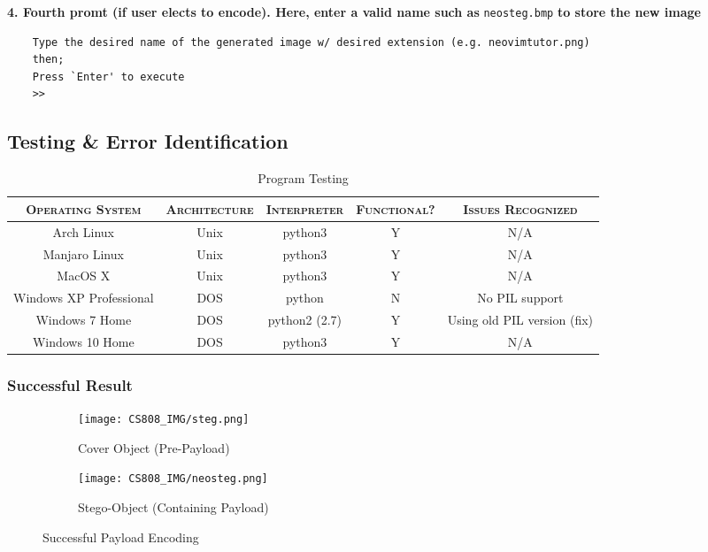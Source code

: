 \documentclass[11pt, english]{article}
\begin{document}
	\textbf{4. Fourth promt (if user elects to encode). Here, enter a valid name such as} \verb|neosteg.bmp| \textbf{to store the new image}

	{\scriptsize\begin{verbatim}
	Type the desired name of the generated image w/ desired extension (e.g. neovimtutor.png)
	then;
	Press `Enter' to execute
	>>
	\end{verbatim}}

\newpage

	\subsection{Testing \& Error Identification}

	\begin{table}[h]
		\scriptsize
		\renewcommand{\arraystretch}{1.25}
	\begin{center}
	\begin{tabular}{c|c|c|c|c}
		\hline
		\textsc{Operating System} & \textsc{Architecture} & \textsc{Interpreter} & \textsc{Functional?} & \textsc{Issues Recognized}\\
		\hline
		Arch Linux & Unix & python3 & Y & N/A\\
		Manjaro Linux & Unix & python3 & Y & N/A\\
		MacOS X & Unix & python3 & Y & N/A\\
		Windows XP Professional & DOS & python & N & No PIL support\\ 
		Windows 7 Home & DOS & python2 (2.7) & Y & Using old PIL version (fix)\\
		Windows 10 Home & DOS & python3 & Y & N/A\\
		\hline
	\end{tabular}
		\caption{Program Testing}
	\end{center}
	\end{table}
	
		\subsubsection{Successful Result}

	\begin{figure}[H]
	\begin{center}
		\begin{subfigure}[t]{6cm}
		\begin{center}
			\texttt{[image: CS808\_IMG/steg.png]}
		\end{center}
			\caption{Cover Object (Pre-Payload)}
		\end{subfigure}
		\begin{subfigure}[t]{6cm}
		\begin{center}
			\texttt{[image: CS808\_IMG/neosteg.png]}
		\end{center}
			\caption{Stego-Object (Containing Payload)}
		\end{subfigure}
	\end{center}
		\caption{Successful Payload Encoding}
	\end{figure}
\end{document}

